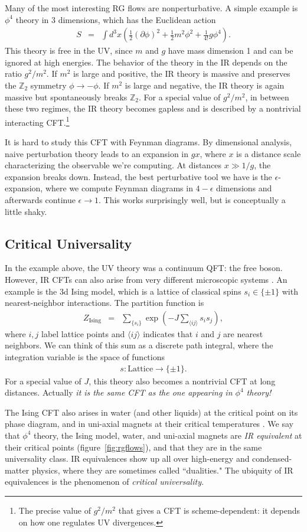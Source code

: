 \documentclass{ws-rv9x6}
\newcommand\be{\begin{eqnarray}}
\newcommand\ee{\end{eqnarray}}
\newcommand\f\phi
\newcommand\p[1]{\left(#1\right)}
\newcommand\ptl\partial
\newcommand\e\epsilon
\newcommand\<\langle
\renewcommand\>\rangle
\newcommand\Z{\mathbb{Z}}
\renewcommand\.{\cdot}
\begin{document}
Many of the most interesting RG flows are nonperturbative. A simple example is $\f^4$ theory in 3 dimensions, which has the Euclidean action
\be
S&=&\int d^3 x\p{\frac 1 2(\ptl\phi)^2 + \frac 1 2 m^2 \phi^2 + \frac 1 {4!}g \phi^4}.
\ee
This theory is free in the UV, since $m$ and $g$ have mass dimension 1 and can be ignored at high energies.  The behavior of the theory in the IR depends on the ratio $g^2/m^2$.  If $m^2$ is large and positive, the IR theory is massive and preserves the $\Z_2$ symmetry $\phi\to -\phi$.  If $m^2$ is large and negative, the IR theory is again massive but spontaneously breaks $\Z_2$.  For a special value of $g^2/m^2$, in between these two regimes, the IR theory becomes gapless and is described by a nontrivial interacting CFT.\footnote{The precise value of $g^2/m^2$ that gives a CFT is scheme-dependent: it depends on how one regulates UV divergences.}

It is hard to study this CFT with Feynman diagrams.  By dimensional analysis, naive perturbation theory leads to an expansion in $gx$, where $x$ is a distance scale characterizing the observable we're computing.  At distances $x\gg 1/g$, the expansion breaks down.  Instead, the best perturbative tool we have is the $\e$-expansion, where we compute Feynman diagrams in $4-\e$ dimensions and afterwards continue $\e\to 1$.  This works surprisingly well, but is conceptually a little shaky.  

\subsection{Critical Universality}

In the example above, the UV theory was a continuum QFT: the free boson.  However, IR CFTs can also arise from very different microscopic systems \cite{Polyakov:1970xd}.  An example is the 3d Ising model, which is a lattice of classical spins $s_i \in \{\pm 1\}$ with nearest-neighbor interactions.  The partition function is
\be
Z_\mathrm{Ising} &=& \sum_{\{s_i\}} \exp\p{-J \sum_{\<ij\>} s_i s_j},
\ee
where $i,j$ label lattice points and $\<ij\>$ indicates that $i$ and $j$ are nearest neighbors.
We can think of this sum as a discrete path integral, where the integration variable is the space of functions
\be
s: \mathrm{Lattice} \to \{\pm 1\}.
\ee
For a special value of $J$, this theory also becomes a nontrivial CFT at long distances. Actually {\it it is the same CFT as the one appearing in $\phi^4$ theory!\/}

The Ising CFT also arises in water (and other liquids) at the critical point on its phase diagram, and in uni-axial magnets at their critical temperatures \cite{Cardy:1996xt}. We say that $\phi^4$ theory, the Ising model, water, and uni-axial magnets are {\it IR equivalent\/} at their critical points (figure~\ref{fig:rgflows}), and that they are in the same universality class.  IR equivalences show up all over high-energy and condensed-matter physics, where they are sometimes called ``dualities."  The ubiquity of IR equivalences is the phenomenon of {\it critical universality.} 
\end{document}
